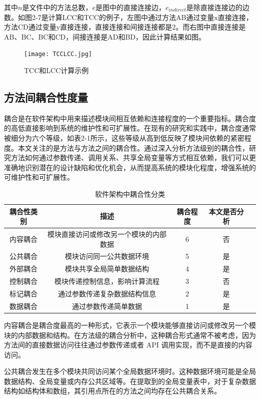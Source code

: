 其中\(n\)是文件中的方法总数，\(e\)是图中的直接连接边，\(e_{indirect}\)是除直接连接边的边数。如图2-7是计算LCC和TCC的例子，左图中通过方法AB通过变量x直接连接，方法CD通过变量y直接连接，直接连接和间接连接都是2。而右图中直接连接是AB、BC、BC和CD，间接连接是AD和BD，因此计算结果如图。

\begin{figure}[h]
\centering
\texttt{[image: TCCLCC.jpg]}
\caption{TCC和LCC计算示例}
\end{figure}


\subsection{方法间耦合性度量}

耦合是在软件架构中用来描述模块间相互依赖和连接程度的一个重要指标。耦合度的高低直接影响到系统的维护性和可扩展性。在现有的研究和实践中，耦合度通常被细分为六个等级，如表2-1所示，这些等级从高到低反映了模块间依赖的紧密程度。本文关注的是方法与方法之间的耦合性。通过深入分析方法级别的耦合性，研究方法如何通过参数传递、调用关系、共享全局变量等方式相互依赖，我们可以更准确地识别潜在的设计缺陷和优化机会，从而提高系统的模块化程度，增强系统的可维护性和可扩展性。

\begin{table}[htbp]
\caption{软件架构中耦合性分类}
\vspace{0.5em}\centering\wuhao
\begin{tabular}{ccccc}
\toprule
耦合性类别 & 描述 & 耦合程度 & 本文是否分析 \\
\midrule
内容耦合 & 模块直接访问或修改另一个模块的内部数据 & 6 & 否\\
公共耦合 & 模块访问同一公共数据环境 & 5 & 是 \\
外部耦合 & 模块共享全局简单数据结构 & 4 & 是 \\
控制耦合 & 模块传递控制信息，影响计算流程 & 3 & 否 \\
标记耦合 & 通过参数传递复杂数据结构信息 & 2 & 是 \\
数据耦合 & 通过参数传递简单数据 & 1 & 是 \\
\bottomrule
\end{tabular}
\end{table}


内容耦合是耦合度最高的一种形式，它表示一个模块能够直接访问或修改另一个模块的内部数据和结构。在方法级的耦合分析中，这种耦合形式通常不被考虑，因为方法间的直接数据访问往往通过参数传递或者 API 调用实现，而不是直接的内容访问。

公共耦合发生在多个模块共同访问某个全局数据环境时。这种数据环境可能是全局数据结构、全局变量或内存公共区域等。在提取到的全局变量表中，对于复杂数据结构如结构体和数组，其引用点所在的方法之间均存在公共耦合关系。


